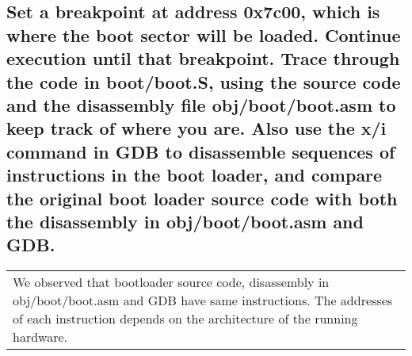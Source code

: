 \documentclass[a4paper]{article}
\begin{document}
	\subsection{Set a breakpoint at address 0x7c00, which is where the boot sector will be loaded. Continue execution until that breakpoint. Trace through the code in boot/boot.S, using the source code and the disassembly file obj/boot/boot.asm to keep track of where you are. Also use the x/i command in GDB to disassemble sequences of instructions in the boot loader, and compare the original boot loader source code with both the disassembly in obj/boot/boot.asm and GDB.}
	\begin{center}
		\begin{tabularx}{0.95\textwidth}{L{1}}
		\textbullet \quad We observed that bootloader source code, disassembly in obj/boot/boot.asm and GDB have same instructions. The addresses of each instruction depends on the architecture of the running hardware.
		\end{tabularx}				
	\end{center}
\end{document}
